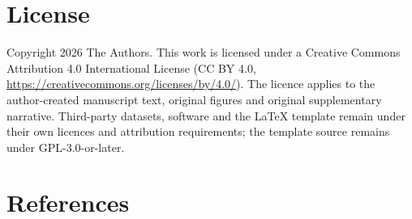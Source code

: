 \documentclass[times,twoside]{_Templates/MultiTargetManuscript}
\begin{document}
\section*{License}

Copyright \textcopyright{} 2026 The Authors. This work is licensed under a
Creative Commons Attribution 4.0 International License (CC BY 4.0,
\url{https://creativecommons.org/licenses/by/4.0/}). The licence applies to the
author-created manuscript text, original figures and original supplementary
narrative. Third-party datasets, software and the LaTeX template remain under
their own licences and attribution requirements; the template source remains
under GPL-3.0-or-later.

\clearpage
\section*{References}
\begingroup
\setlength{\emergencystretch}{5em}
\sloppy

\endgroup
\end{document}

